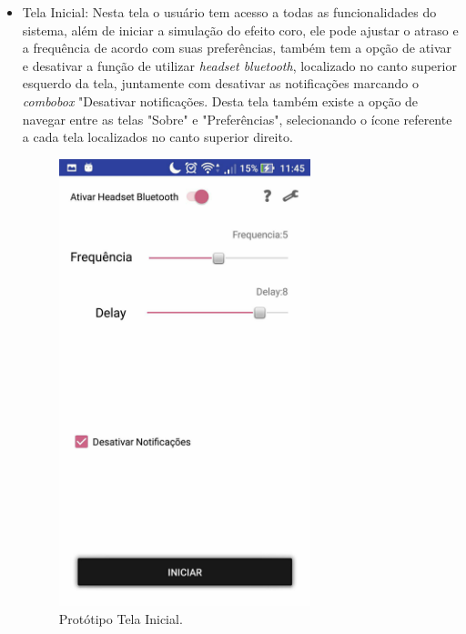 \begin{itemize}
	\item Tela Inicial: Nesta tela o usu\'ario tem acesso a todas as funcionalidades do sistema, al\'em de iniciar a simula\c{c}\~ao do efeito coro, ele pode ajustar o atraso e a frequ\^encia de acordo com suas prefer\^encias, tamb\'em tem a op\c{c}\~ao de ativar e desativar a fun\c{c}\~ao de utilizar \textit{headset bluetooth}, localizado no canto superior esquerdo da tela, juntamente com desativar as notifica\c{c}\~oes marcando o \textit{combobox} "Desativar notifica\c{c}\~oes. Desta tela tamb\'em existe a op\c{c}\~ao de navegar entre as telas "Sobre" e "Prefer\^encias", selecionando o \'icone referente a cada tela localizados no canto superior direito.
	\begin{figure}[H]
		\centering
		\caption[Prot\'otipo Tela Inicial]{Prot\'otipo Tela Inicial. \label{fig:prototipotelainicial}}
		\includegraphics[height=13cm]{./Figuras/prototipo_telainicial.jpg}%
	\end{figure}
	

\end{itemize}
